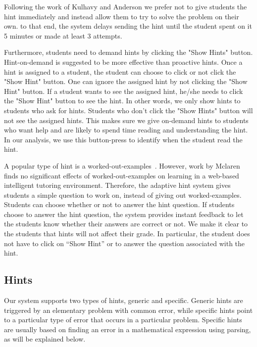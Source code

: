 \documentclass{llncs2e/llncs}
\begin{document}
Following the work of Kulhavy and Anderson\cite{Kulhavy1972} we prefer not to give students the hint immediately and instead allow them to try to solve the problem on their own. to that end, the system delays sending the hint until the student spent on it 5 minutes or made at least 3 attempts.

Furthermore, students need to demand hints by clicking the "Show Hints" button. Hint-on-demand is suggested to be more effective than proactive hints\cite{Razzaq2010}. Once a hint is assigned to a student, the student can choose to click or not click the "Show Hint" button. One can ignore the assigned hint by not clicking the "Show Hint" button. If a student wants to see the assigned hint, he/she needs to click the "Show Hint" button to see the hint. In other words, we only show hints to students who ask for hints. Students who don't click the "Show Hints" button will not see the assigned hints. This makes sure we give on-demand hints to students who want help and are likely to spend time reading and understanding the hint.  In our analysis, we use this button-press to identify when the student read the hint.

A popular type of hint is a worked-out-examples~\cite{Atkinson2000}. However, work by Mclaren~\cite{McLaren2006} finds no significant effects of worked-out-examples on learning in a web-based intelligent tutoring environment. Therefore, the adaptive hint system gives students a simple question to work on, instead of giving out worked-examples. Students can choose whether or not to answer the hint question. If students choose to answer the hint question, the system provides instant feedback to let the students know whether their answers are correct or not. We make it clear to the students that hints will not affect their grade. In particular, the student does not have to click on ``Show Hint'' or to answer the question associated with the hint.

\subsection*{Hints}

Our system supports two types of hints, generic and specific. Generic hints are triggered by an elementary problem with common error, while specific hints point to a particular type of error that occurs in a particular problem. Specific hints are usually based on finding an error in a mathematical expression using parsing, as will be explained below.
\end{document}
